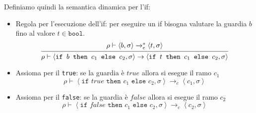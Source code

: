 \documentclass[a4paper]{article}
\begin{document}
\begin{itemize}
    \noindent
    Definiamo quindi la semantica dinamica per l'if:
    \begin{itemize}
      \item Regola per l'esecuzione dell'if: per eseguire un if bisogna valutare la guardia
        \( b \) fino al valore \( t \in \texttt{bool} \).
        \[
          \begin{prooftree}
            \hypo{ 
              \rho \vdash \left< b, \sigma  \right> \to^*_e \left< t, \sigma  \right>
            }
            \infer1{ 
              \rho \vdash \left< \texttt{if } b \texttt{ then } c_1 \texttt{ else } c_2,
              \sigma  \right>
              \to 
              \left< \texttt{if } t \texttt{ then } c_1 \texttt{ else } c_2, \sigma  \right>
            }
          \end{prooftree}
        \] 

      \item Assioma per il \texttt{true}:
        se la guardia è \( true \) allora si esegue il ramo \( c_1 \)
        \[
          \rho \vdash \left< \texttt{if } true \texttt{ then } c_1 \texttt{ else } c_2,
          \sigma  \right> \to_c
          \left< c_1, \sigma  \right>
        \] 

      \item Assioma per il \texttt{false}:
        se la guardia è \( false \) allora si esegue il ramo \( c_2 \)
        \[
          \rho \vdash \left< \texttt{if } false \texttt{ then } c_1 \texttt{ else } c_2,
          \sigma  \right> \to_c
          \left< c_2, \sigma  \right>
        \]
    \end{itemize}
\end{itemize}
\end{document}
